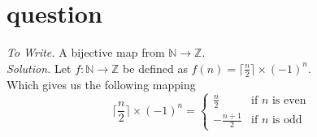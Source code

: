 \documentclass[11pt]{article}
\begin{document}
\section{question}
\emph{To Write. } A bijective map from $\mathbb{N} \to \mathbb{Z}.$ \medskip \\
\emph{Solution. } Let $f:\mathbb{N} \to \mathbb{Z}$ be defined as $f(n) = \lceil{\frac{n}{2}}\rceil \times (-1)^n$. \\
Which gives us the following mapping $$
\lceil{\frac{n}{2}\rceil} \times (-1)^n =\begin{cases}
    \frac{n}{2} & \text{if $n$ is even} \\
    -\frac{n+1}{2} & \text{if $n$ is odd}
		 \end{cases}
$$
\end{document}
